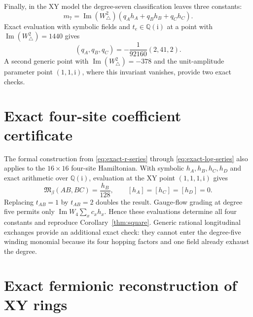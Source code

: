 \documentclass[11pt]{article}
\newcommand{\Mmod}{\mathfrak{M}}
\newcommand{\ii}{\mathrm{i}}
\begin{document}
Finally, in the XY model the degree-seven classification leaves
three constants:
\begin{equation}
 m_7=\operatorname{Im}(W_\triangle^2)
 (q_Ah_A+q_Bh_B+q_Ch_C).
 \label{eq:m7-ansatz}
\end{equation}
Exact evaluation with symbolic fields and $t_e\in\mathbb Q(\ii)$ at a point with
$\operatorname{Im}(W_\triangle^2)=1440$ gives
\begin{equation}
 (q_A,q_B,q_C)=-\frac1{92160}(2,41,2).
 \label{eq:m7-coefficients}
\end{equation}
A second generic point with
$\operatorname{Im}(W_\triangle^2)=-378$ and the unit-amplitude parameter
point $(1,1,\ii)$, where this invariant vanishes, provide two exact checks.

\section{Exact four-site coefficient certificate}
\label{app:ring-certificate}

The formal construction from \eqref{eq:exact-r-series} through
\eqref{eq:exact-log-series} also applies to the $16\times16$ four-site
Hamiltonian.  With symbolic $h_A,h_B,h_C,h_D$ and exact arithmetic over
$\mathbb Q(\ii)$, evaluation at the XY point $(1,1,1,\ii)$ gives
\begin{equation}
 [\beta^5]\Mmod_\beta(AB,BC)=\frac{h_B}{128},
 \qquad
 [h_A]=[h_C]=[h_D]=0.
 \label{eq:square-certificate}
\end{equation}
Replacing $t_{AB}=1$ by $t_{AB}=2$ doubles the result.  Gauge-flow grading at
degree five permits only
$\operatorname{Im}W_4\sum_xc_xh_x$.  Hence these evaluations determine all
four constants and reproduce Corollary~\ref{thm:square}.  Generic rational
longitudinal exchanges provide an additional exact check: they cannot enter
the degree-five winding monomial because its four hopping factors and one
field already exhaust the degree.

\section{Exact fermionic reconstruction of XY rings}
\label{app:fermionic-ring}
\end{document}
